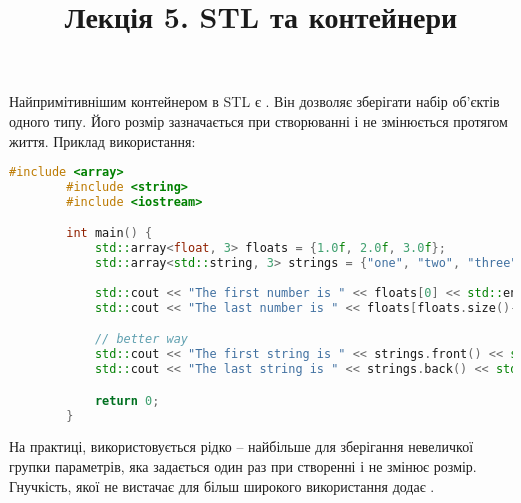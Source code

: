 \documentclass[12pt]{article}
\title{Лекція 5. STL та контейнери}
\begin{document}
	\maketitle

	\tableofcontents
	
	\section{}
	Найпримітивнішим контейнером в STL є \href{https://en.cppreference.com/w/cpp/container/array}{}. Він дозволяє зберігати набір об'єктів одного типу. Його розмір зазначається при створюванні і не змінюється протягом життя. Приклад використання:
	\begin{lstlisting}[language=c++]
		#include <array>
		#include <string>
		#include <iostream>

		int main() {
			std::array<float, 3> floats = {1.0f, 2.0f, 3.0f};
			std::array<std::string, 3> strings = {"one", "two", "three"};
			
			std::cout << "The first number is " << floats[0] << std::endl;
			std::cout << "The last number is " << floats[floats.size()-1] << std::endl;

			// better way
			std::cout << "The first string is " << strings.front() << std::endl;
			std::cout << "The last string is " << strings.back() << std::endl;

			return 0; 
		}
	\end{lstlisting}
	На практиці,  використовується рідко -- найбільше для зберігання невеличкої групки параметрів, яка задається один раз при створенні і не змінює розмір.
	Гнучкість, якої не вистачає  для більш широкого використання додає .
\end{document}
